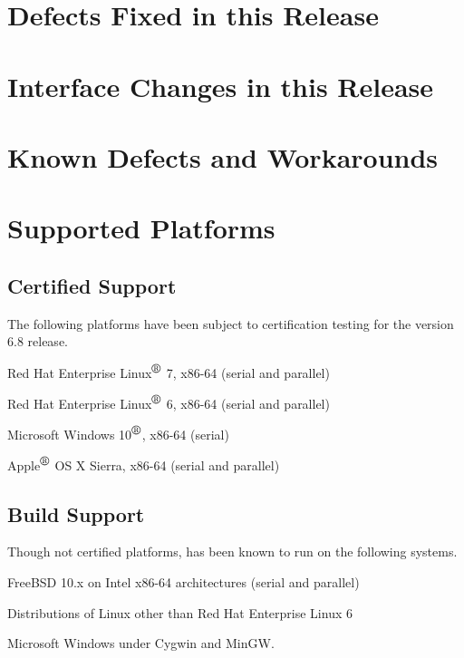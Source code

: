 \documentclass{article}
\begin{document}
\newpage
\section{Defects Fixed in this Release}



\newpage
\section{Interface Changes in this Release}



\newpage
\section{Known Defects and Workarounds}



\newpage
\section{Supported Platforms}
\subsection*{Certified Support}
The following platforms have been subject to certification testing for the
\Xyce{} version 6.8 release.
\begin{XyceItemize}
  \item Red Hat Enterprise Linux${}^{\mbox{\textregistered}}$ 7, x86-64 (serial and parallel)
  \item Red Hat Enterprise Linux${}^{\mbox{\textregistered}}$ 6, x86-64 (serial and parallel)
  \item Microsoft Windows 10${}^{\mbox{\textregistered}}$, x86-64 (serial)
  \item Apple${}^{\mbox{\textregistered}}$ OS X Sierra, x86-64 (serial and parallel)
\end{XyceItemize}

\subsection*{Build Support}
Though not certified platforms, \Xyce{} has been known to run on the following
systems.
\begin{XyceItemize}
  \item FreeBSD 10.x on Intel x86-64 architectures (serial and parallel)
  \item Distributions of Linux other than Red Hat Enterprise Linux 6
  \item Microsoft Windows under Cygwin and MinGW.
\end{XyceItemize}
\end{document}
